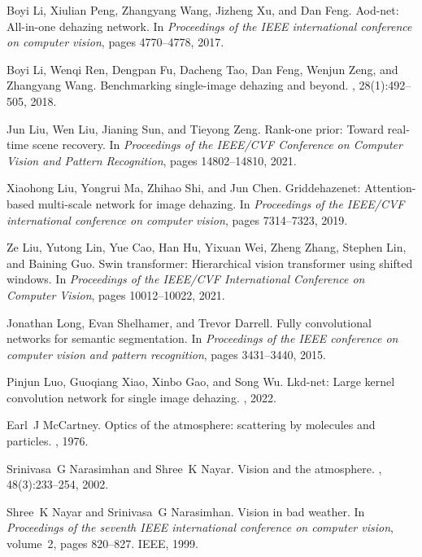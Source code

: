 \documentclass[10pt,twocolumn,letterpaper]{article}
\begin{document}
\begin{thebibliography}{10}
Boyi Li, Xiulian Peng, Zhangyang Wang, Jizheng Xu, and Dan Feng.
\newblock Aod-net: All-in-one dehazing network.
\newblock In {\em Proceedings of the IEEE international conference on computer
  vision}, pages 4770--4778, 2017.

Boyi Li, Wenqi Ren, Dengpan Fu, Dacheng Tao, Dan Feng, Wenjun Zeng, and
  Zhangyang Wang.
\newblock Benchmarking single-image dehazing and beyond.
, 28(1):492--505, 2018.

Jun Liu, Wen Liu, Jianing Sun, and Tieyong Zeng.
\newblock Rank-one prior: Toward real-time scene recovery.
\newblock In {\em Proceedings of the IEEE/CVF Conference on Computer Vision and
  Pattern Recognition}, pages 14802--14810, 2021.

Xiaohong Liu, Yongrui Ma, Zhihao Shi, and Jun Chen.
\newblock Griddehazenet: Attention-based multi-scale network for image
  dehazing.
\newblock In {\em Proceedings of the IEEE/CVF international conference on
  computer vision}, pages 7314--7323, 2019.

Ze Liu, Yutong Lin, Yue Cao, Han Hu, Yixuan Wei, Zheng Zhang, Stephen Lin, and
  Baining Guo.
\newblock Swin transformer: Hierarchical vision transformer using shifted
  windows.
\newblock In {\em Proceedings of the IEEE/CVF International Conference on
  Computer Vision}, pages 10012--10022, 2021.

Jonathan Long, Evan Shelhamer, and Trevor Darrell.
\newblock Fully convolutional networks for semantic segmentation.
\newblock In {\em Proceedings of the IEEE conference on computer vision and
  pattern recognition}, pages 3431--3440, 2015.

Pinjun Luo, Guoqiang Xiao, Xinbo Gao, and Song Wu.
\newblock Lkd-net: Large kernel convolution network for single image dehazing.
, 2022.

Earl~J McCartney.
\newblock Optics of the atmosphere: scattering by molecules and particles.
, 1976.

Srinivasa~G Narasimhan and Shree~K Nayar.
\newblock Vision and the atmosphere.
, 48(3):233--254, 2002.

Shree~K Nayar and Srinivasa~G Narasimhan.
\newblock Vision in bad weather.
\newblock In {\em Proceedings of the seventh IEEE international conference on
  computer vision}, volume~2, pages 820--827. IEEE, 1999.


\end{thebibliography}
\end{document}

